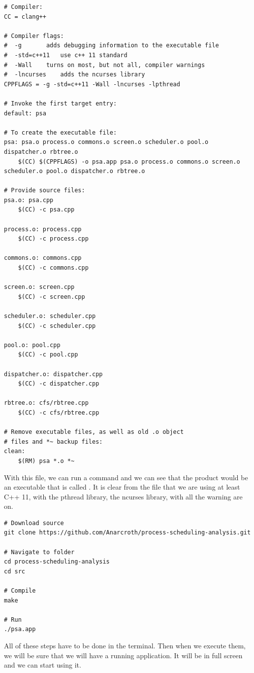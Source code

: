 \documentclass{article}
\newcommand{\code}[1]{\codeinline{\texttt{#1}}}
\begin{document}
\begin{lstlisting}
# Compiler:
CC = clang++

# Compiler flags:
#  -g    	adds debugging information to the executable file
#  -std=c++11	use c++ 11 standard
#  -Wall 	turns on most, but not all, compiler warnings
#  -lncurses  	adds the ncurses library
CPPFLAGS = -g -std=c++11 -Wall -lncurses -lpthread

# Invoke the first target entry:
default: psa

# To create the executable file:
psa: psa.o process.o commons.o screen.o scheduler.o pool.o dispatcher.o rbtree.o
	$(CC) $(CPPFLAGS) -o psa.app psa.o process.o commons.o screen.o scheduler.o pool.o dispatcher.o rbtree.o

# Provide source files:
psa.o: psa.cpp
	$(CC) -c psa.cpp

process.o: process.cpp
	$(CC) -c process.cpp

commons.o: commons.cpp
	$(CC) -c commons.cpp

screen.o: screen.cpp
	$(CC) -c screen.cpp

scheduler.o: scheduler.cpp
	$(CC) -c scheduler.cpp

pool.o: pool.cpp
	$(CC) -c pool.cpp

dispatcher.o: dispatcher.cpp
	$(CC) -c dispatcher.cpp

rbtree.o: cfs/rbtree.cpp
	$(CC) -c cfs/rbtree.cpp

# Remove executable files, as well as old .o object
# files and *~ backup files:
clean:
	$(RM) psa *.o *~
\end{lstlisting}

With this file, we can run a command and we can see that the product would be an executable that is called \code{psa.app}. It is clear from the file that we are using at least C++ 11, with the pthread library, the ncurses library, with all the warning are on.

\begin{lstlisting}
# Download source
git clone https://github.com/Anarcroth/process-scheduling-analysis.git

# Navigate to folder
cd process-scheduling-analysis
cd src

# Compile
make

# Run
./psa.app
\end{lstlisting}

All of these steps have to be done in the terminal. Then when we execute them, we will be sure that we will have a running application. It will be in full screen and we can start using it.
\end{document}
